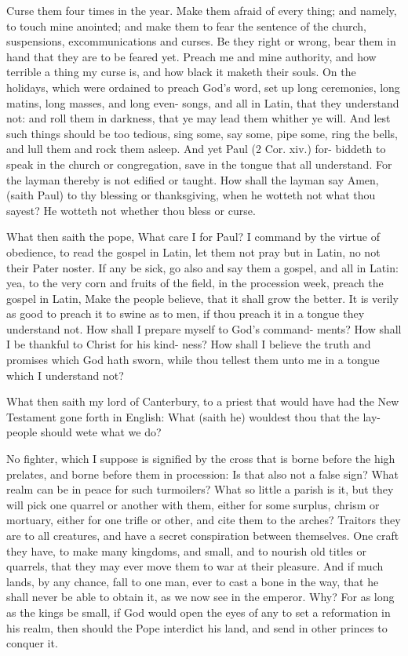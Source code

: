\documentclass{custom}
\begin{document}
Curse them four times in the year. Make them afraid 
of every thing; and namely, to touch mine anointed; and 
make them to fear the sentence of the church, suspensions, 
excommunications and curses. Be they right or wrong, 
bear them in hand that they are to be feared yet. Preach 
me and mine authority, and how terrible a thing my curse 
is, and how black it maketh their souls. On the holidays, 
which were ordained to preach God's word, set up long 
ceremonies, long matins, long masses, and long even- 
songs, and all in Latin, that they understand not: and 
roll them in darkness, that ye may lead them whither 
ye will. And lest such things should be too tedious, sing 
some, say some, pipe some, ring the bells, and lull them 
and rock them asleep. And yet Paul (2 Cor. xiv.) for- 
biddeth to speak in the church or congregation, save in 
the tongue that all understand. For the layman thereby 
is not edified or taught. How shall the layman say Amen, 
(saith Paul) to thy blessing or thanksgiving, when he 
wotteth not what thou sayest? He wotteth not whether 
thou bless or curse. 

What then saith the pope, What care I for Paul? I 
command by the virtue of obedience, to read the gospel 
in Latin, let them not pray but in Latin, no not their 
Pater noster. If any be sick, go also and say them 
a gospel, and all in Latin: yea, to the very corn and 
fruits of the field, in the procession week, preach the 
gospel in Latin, Make the people believe, that it shall 
grow the better. It is verily as good to preach it to swine 
as to men, if thou preach it in a tongue they understand 
not. How shall I prepare myself to God's command- 
ments? How shall I be thankful to Christ for his kind- 
ness? How shall I believe the truth and promises which 
God hath sworn, while thou tellest them unto me in a 
tongue which I understand not? 

What then saith my lord of Canterbury, to a priest 
that would have had the New Testament gone forth in 
English: What (saith he) wouldest thou that the lay- 
people should wete what we do? 

No fighter, which I suppose is signified by the cross 
that is borne before the high prelates, and borne before 
them in procession: Is that also not a false sign? What 
realm can be in peace for such turmoilers? What so 
little a parish is it, but they will pick one quarrel or 
another with them, either for some surplus, chrism or 
mortuary, either for one trifle or other, and cite them to 
the arches? Traitors they are to all creatures, and have 
a secret conspiration between themselves. One craft they 
have, to make many kingdoms, and small, and to nourish 
old titles or quarrels, that they may ever move them to 
war at their pleasure. And if much lands, by any chance, 
fall to one man, ever to cast a bone in the way, that he 
shall never be able to obtain it, as we now see in the 
emperor. Why? For as long as the kings be small, if 
God would open the eyes of any to set a reformation in 
his realm, then should the Pope interdict his land, and 
send in other princes to conquer it. 
\end{document}

